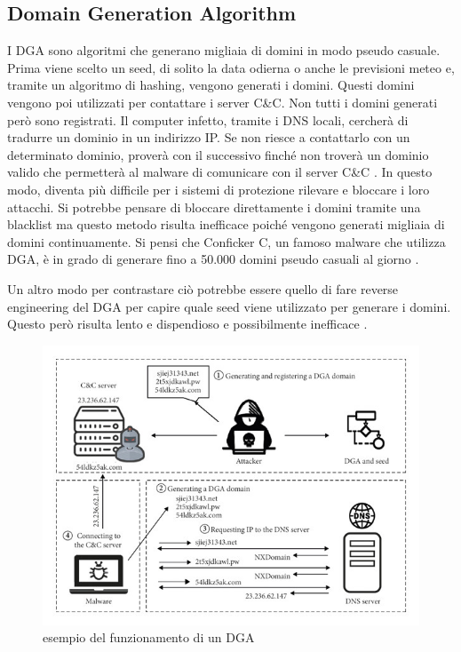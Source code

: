 \documentclass[12pt,a4paper,openright,twoside]{book}
\begin{document}
\subsection{Domain Generation Algorithm}


I \acrshort{DGA} sono algoritmi che generano migliaia di domini in modo pseudo casuale.
Prima viene scelto un seed, di solito la data odierna
o anche le previsioni meteo \cite{8621875} e, tramite
un algoritmo di hashing, vengono generati i domini.
Questi domini vengono poi utilizzati per contattare i server \acrshort{C&C}.
Non tutti i domini generati però sono registrati.
Il computer infetto, tramite i DNS locali, cercherà di tradurre
un dominio in un indirizzo IP.
Se non riesce a contattarlo con un determinato dominio,
proverà con il successivo finché non troverà
un dominio valido che permetterà al malware di comunicare con
il server \acrshort{C&C} \cite{8489147}.
In questo modo, diventa più difficile per i sistemi di protezione
rilevare e bloccare i loro attacchi.
Si potrebbe pensare di bloccare direttamente i domini tramite
una blacklist ma questo metodo
risulta inefficace poiché vengono generati migliaia di domini
continuamente. Si pensi che Conficker C, un famoso malware
che utilizza \acrshort{DGA}, è in grado di generare
fino a 50.000 domini pseudo casuali al giorno \cite{978131}.

Un altro modo per contrastare ciò
potrebbe essere quello di fare reverse engineering
del \acrshort{DGA} per capire quale seed viene utilizzato per generare i domini.
Questo però risulta lento e dispendioso e possibilmente inefficace \cite{8887881}.

\begin{figure}
    \centering
    \includegraphics[width=.8\linewidth]{figures/DGA example.jpg}
    \caption{esempio del funzionamento di un \acrshort{DGA}}
    \label{fig:DGA example}
\end{figure}
\end{document}
